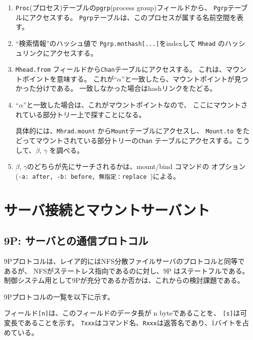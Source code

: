 \begin{enumerate}
\item  {\tt Proc}(プロセス)テーブルの{\tt pgrp}(process group)フィールドから、
  {\tt Pgrp}テーブルにアクセスする。
   {\tt Pgrp}テーブルは、このプロセスが属する名前空間を表す。

\item   ``検索情報''のハッシュ値で {\tt Pgrp.mnthash[...]}をindexして
    {\tt Mhead} のハッシュリンクにアクセスする。

\item    {\tt Mhead.from} フィールドから{\tt  Chan}テーブルにアクセスする。
        これは、マウントポイントを意味する。
        これが``$\alpha$''と一致したら、マウントポイントが見つかった分けである。
         一致しなかった場合はhashリンクをたどる。

\item   ``$\alpha$''と一致した場合は、これがマウントポイントなので、
       ここにマウントされている部分トリー上で探すことになる。

       具体的には、{\tt Mhrad.mount} から{\tt Mount}テーブルにアクセスし、
       {\tt Mount.to} をたどってマウントされている部分トリーの{\tt Chan}
       テーブルにアクセスする。こうして、$\beta$, $\gamma$ を調べる。

\item   $\beta$, $\gamma$のどちらが先にサーチされるかは、mount/bind コマンドの
  オプション ({\tt -a: after, -b: before, 無指定：replace })による。

\end{enumerate}

\vspace{4cm}




\chapter{サーバ接続とマウントサーバント}
\section{9P: サーバとの通信プロトコル}

  9Pプロトコルは、レイア的にはNFS分散ファイルサーバのプロトコルと同等であるが、
  NFSがステートレス指向であるのに対し、9P はステートフルである。
  制御システム用として9Pが充分であるか否かは、これからの検討課題である。

   9Pプロトコルの一覧を以下に示す。

   フィールド{\tt [n]}は、このフィールドのデータ長が n byteであることを、
{\tt [s]}は可変長であることを示す。
{\tt Txxx}はコマンド名、{\tt Rxxx}は返答名であり、1バイトを占めている。

